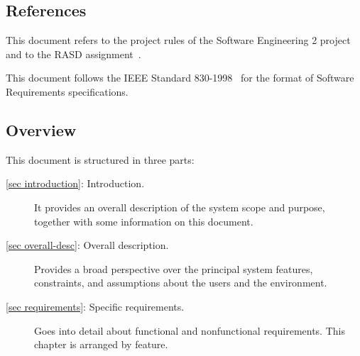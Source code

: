 \subsection{References}
This document refers to the project rules of the Software Engineering 2 project~\cite{se-project-rules} and to the RASD assignment~\cite{se-assignment}.

This document follows the IEEE Standard 830-1998~\cite{ieee-830-1198} for the format of Software Requirements specifications.

\subsection{Overview}
This document is structured in three parts:
\begin{description}
	\item[\autoref{sec introduction}: Introduction.] It provides an overall description of the system scope and purpose, together with some information on this document.
	\item[\autoref{sec overall-desc}: Overall description.] Provides a broad perspective over the principal system features, constraints, and assumptions about the users and the environment.
	\item[\autoref{sec requirements}: Specific requirements.] Goes into detail about functional and nonfunctional requirements. This chapter is arranged by feature.
\end{description}

